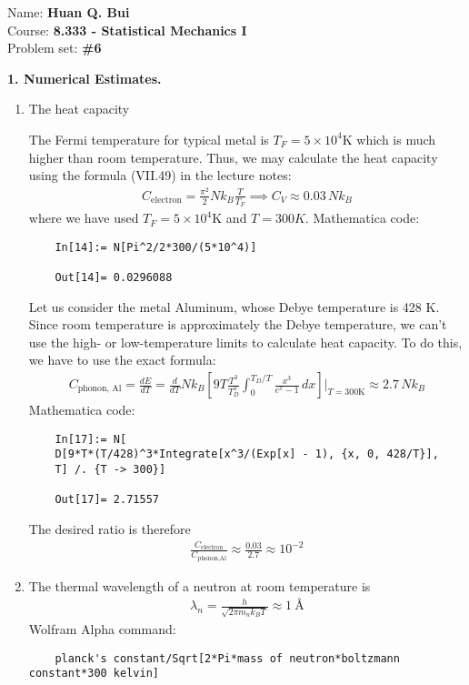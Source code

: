 \documentclass{article}
\theoremstyle{definition}
\newcommand{\f}[2]{\frac{#1}{#2}}
\newcommand{\lb}{\left[}
\newcommand{\rb}{\right]}
\begin{document}
		\begin{framed}
			\noindent Name: \textbf{Huan Q. Bui}\\
			Course: \textbf{8.333 - Statistical Mechanics I}\\
			Problem set: \textbf{\#6}
		\end{framed}
	
	
\noindent \textbf{1. Numerical Estimates.}

\begin{enumerate}[label=(\alph*)]
	\item The heat capacity 
	
	
	The Fermi temperature for typical metal is $T_F = 5 \times 10^{4} $K which is much higher than room temperature. Thus, we may calculate the heat capacity using the formula (VII.49) in the lecture notes:
	\begin{align*}
	C_\text{electron} = \f{\pi^2}{2}Nk_B \f{T}{T_F} \implies C_V \approx  0.03 \, Nk_B 
	\end{align*}
	where we have used $T_F = 5\times 10^4$K and $T = 300K$. Mathematica code:
	\begin{lstlisting}
	In[14]:= N[Pi^2/2*300/(5*10^4)]
	
	Out[14]= 0.0296088
	\end{lstlisting}
	
	Let us consider the metal Aluminum, whose Debye temperature is 428 K. Since room temperature is approximately the Debye temperature, we can't use the high- or low-temperature limits to calculate heat capacity. To do this, we have to use the exact formula:
	\begin{align*}
	C_\text{phonon, Al} = \f{dE}{dT} = \f{d}{dT} Nk_B \lb 9 T \f{T^3}{T_D^3} \int_0^{T_D/T} \f{x^3}{e^x - 1}\,dx \rb \bigg\vert_{T = 300 \text{K}}\approx 2.7\, Nk_B
	\end{align*}
	Mathematica code:
	\begin{lstlisting}
	In[17]:= N[
	D[9*T*(T/428)^3*Integrate[x^3/(Exp[x] - 1), {x, 0, 428/T}], 
	T] /. {T -> 300}]
	
	Out[17]= 2.71557
	\end{lstlisting}
	
	
	The desired ratio is therefore
	\begin{align*}
	\f{C_\text{electron}}{C_\text{phonon,Al}} \approx \f{0.03}{2.7} \approx \boxed{10^{-2}}
	\end{align*}
	
	\item The thermal wavelength of a neutron at room temperature is 
	\begin{align*}
	\lambda_n = \f{h}{\sqrt{2\pi m_n k_B T}} \approx \boxed{\SI{1}{\angstrom}}
	\end{align*}
	Wolfram Alpha command:
	\begin{lstlisting}
	planck's constant/Sqrt[2*Pi*mass of neutron*boltzmann constant*300 kelvin]
	

\end{lstlisting}
\end{enumerate}
\end{document}
